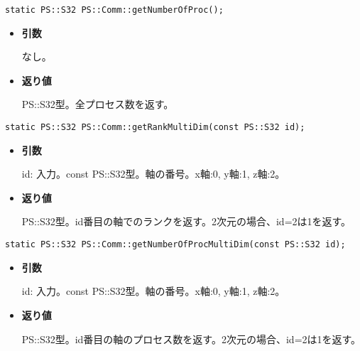 
\begin{screen}
\begin{verbatim}
static PS::S32 PS::Comm::getNumberOfProc();
\end{verbatim}
\end{screen}

\begin{itemize}

\item{{\bf 引数}}

なし。

\item{{\bf 返り値}}

PS::S32型。全プロセス数を返す。

\end{itemize}


\begin{screen}
\begin{verbatim}
static PS::S32 PS::Comm::getRankMultiDim(const PS::S32 id);
\end{verbatim}
\end{screen}

\begin{itemize}

\item{{\bf 引数}}

id: 入力。const PS::S32型。軸の番号。x軸:0, y軸:1, z軸:2。

\item{{\bf 返り値}}

PS::S32型。id番目の軸でのランクを返す。2次元の場合、id=2は1を返す。

\end{itemize}


\begin{screen}
\begin{verbatim}
static PS::S32 PS::Comm::getNumberOfProcMultiDim(const PS::S32 id);
\end{verbatim}
\end{screen}

\begin{itemize}

\item{{\bf 引数}}

id: 入力。const PS::S32型。軸の番号。x軸:0, y軸:1, z軸:2。

\item{{\bf 返り値}}

PS::S32型。id番目の軸のプロセス数を返す。2次元の場合、id=2は1を返す。

\end{itemize}

